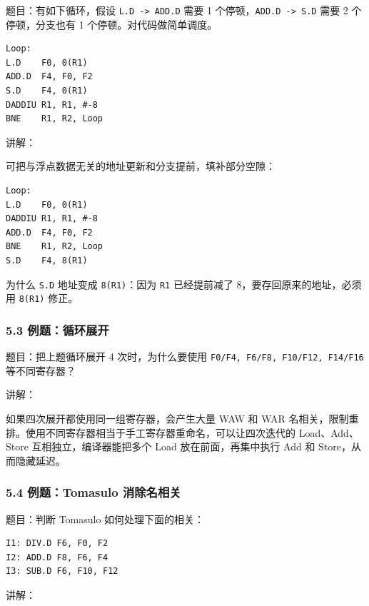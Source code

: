 \documentclass[
]{ctexart}
\newcommand{\passthrough}[1]{#1}
\begin{document}
题目：有如下循环，假设 \passthrough{\lstinline!L.D -> ADD.D!} 需要 1
个停顿，\passthrough{\lstinline!ADD.D -> S.D!} 需要 2 个停顿，分支也有 1
个停顿。对代码做简单调度。

\begin{lstlisting}
Loop:
L.D    F0, 0(R1)
ADD.D  F4, F0, F2
S.D    F4, 0(R1)
DADDIU R1, R1, #-8
BNE    R1, R2, Loop
\end{lstlisting}

讲解：

可把与浮点数据无关的地址更新和分支提前，填补部分空隙：

\begin{lstlisting}
Loop:
L.D    F0, 0(R1)
DADDIU R1, R1, #-8
ADD.D  F4, F0, F2
BNE    R1, R2, Loop
S.D    F4, 8(R1)
\end{lstlisting}

为什么 \passthrough{\lstinline!S.D!} 地址变成
\passthrough{\lstinline!8(R1)!}：因为 \passthrough{\lstinline!R1!}
已经提前减了 8，要存回原来的地址，必须用 \passthrough{\lstinline!8(R1)!}
修正。

\subsubsection{5.3
例题：循环展开}\label{ux4f8bux9898ux5faaux73afux5c55ux5f00}

题目：把上题循环展开 4 次时，为什么要使用
\passthrough{\lstinline!F0/F4, F6/F8, F10/F12, F14/F16!} 等不同寄存器？

讲解：

如果四次展开都使用同一组寄存器，会产生大量 WAW 和 WAR
名相关，限制重排。使用不同寄存器相当于手工寄存器重命名，可以让四次迭代的
Load、Add、Store 互相独立，编译器能把多个 Load 放在前面，再集中执行 Add
和 Store，从而隐藏延迟。

\subsubsection{5.4 例题：Tomasulo
消除名相关}\label{ux4f8bux9898tomasulo-ux6d88ux9664ux540dux76f8ux5173}

题目：判断 Tomasulo 如何处理下面的相关：

\begin{lstlisting}
I1: DIV.D F6, F0, F2
I2: ADD.D F8, F6, F4
I3: SUB.D F6, F10, F12
\end{lstlisting}

讲解：
\end{document}
